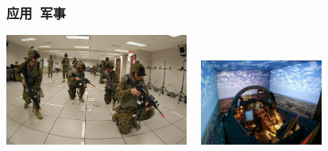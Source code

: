 \documentclass{beamer}
\begin{document}
\begin{frame}
	\frametitle{应用~{\small 军事}}
	\begin{center}
		\includegraphics[width=6cm]{images/US_Navy_virtual_reality_system.png}~~
		\includegraphics[width=4cm]{images/virtual-reality-plane-trainer-cockpit.jpg}
	\end{center}
\end{frame}
\end{document}
